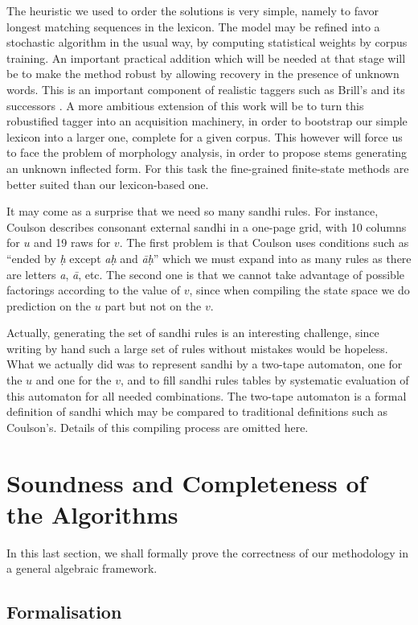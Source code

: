 The heuristic we used to order the solutions is very simple, namely to favor
longest matching sequences in the lexicon. The model may be refined into
a stochastic algorithm in the usual way, by computing statistical weights 
by corpus training. An important practical addition which will be needed
at that stage will be to make the method robust by allowing recovery
in the presence of unknown words. This is an important component of 
realistic taggers such as Brill's and its successors \cite{brill,rs1}. 
A more ambitious extension
of this work will be to turn this robustified tagger into an acquisition
machinery, in order to bootstrap our simple lexicon into a larger one, complete
for a given corpus. This however will force us to face the problem of 
morphology analysis, in order to propose stems generating an unknown inflected
form. For this task the fine-grained finite-state methods are better suited
than our lexicon-based one. 

It may come as a surprise that we need so many sandhi rules.
For instance, Coulson \cite{coulson} describes consonant external sandhi 
in a one-page
grid, with 10 columns for $u$ and 19 raws for $v$. The first problem is
that Coulson uses conditions such as ``ended by {\sl \d h} except {\sl a\d h}
and {\sl \=a\d h}'' which we must expand into as many rules as there
are letters {\sl a}, {\sl \=a}, etc. The second one is that we cannot take
advantage of possible factorings according to the value of $v$, since when
compiling the state space we do prediction on the $u$ part but not on the
$v$. 

Actually, generating the set of sandhi rules is an interesting challenge,
since writing by hand such a large set of rules without mistakes
would be hopeless. What we actually did was to represent sandhi by a 
two-tape automaton, one for the $u$ and one for the $v$, and to fill
sandhi rules tables by systematic evaluation of this automaton for
all needed combinations. The two-tape automaton is a formal definition
of sandhi which may be compared to traditional definitions such as Coulson's.
Details of this compiling process are omitted here. 

\section{Soundness and Completeness of the Algorithms}
\label{formal}
In this last section, we shall formally prove the correctness of our 
methodology in a general algebraic framework.

\subsection{Formalisation}

